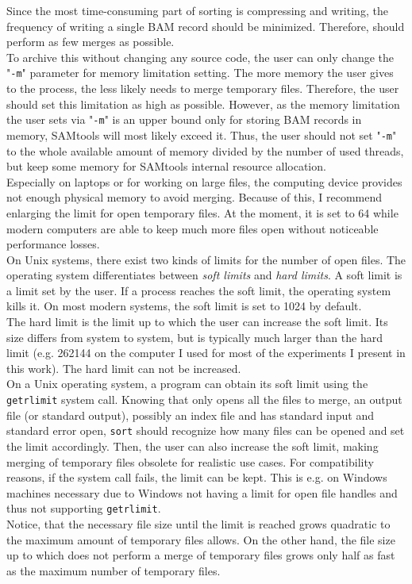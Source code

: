 Since the most time-consuming part of sorting is compressing and writing, the frequency of writing a single BAM record should be minimized. Therefore, \sort should perform as few merges as possible. \\
To archive this without changing any source code, the user can only change the "\texttt{-m}" parameter for memory limitation setting. The more memory the user gives to the process, the less likely \sort needs to merge temporary files. Therefore, the user should set this limitation as high as possible. However, as the memory limitation the user sets via "\texttt{-m}" is an upper bound only for storing BAM records in memory, SAMtools will most likely exceed it. Thus, the user should not set "\texttt{-m}" to the whole available amount of memory divided by the number of used threads, but keep some memory for SAMtools internal resource allocation. \\
Especially on laptops or for working on large files, the computing device provides not enough physical memory to avoid merging. Because of this, I recommend enlarging the limit for open temporary files. At the moment, it is set to 64 while modern computers are able to keep much more files open without noticeable performance losses. \\
On Unix systems, there exist two kinds of limits for the number of open files. The operating system differentiates between \textit{soft limits} and \textit{hard limits}.
A soft limit is a limit set by the user. If a process reaches the soft limit, the operating system kills it. On most modern systems, the soft limit is set to 1024 by default. \\
The hard limit is the limit up to which the user can increase the soft limit. Its size differs from system to system, but is typically much larger than the hard limit (e.g. 262144 on the computer I used for most of the experiments I present in this work). The hard limit can not be increased. \\
On a Unix operating system, a program can obtain its soft limit using the \texttt{getrlimit} \cite{noauthor_getrlimit2_nodate} system call. Knowing that \sort only opens all the files to merge, an output file (or standard output), possibly an index file and has standard input and standard error open, \texttt{sort} should recognize how many files can be opened and set the limit accordingly. Then, the user can also increase the soft limit, making merging of temporary files obsolete for realistic use cases. For compatibility reasons, if the system call fails, the limit can be kept.
This is e.g. on Windows machines necessary due to Windows not having a limit for open file handles and thus not supporting \texttt{getrlimit}. \\
Notice, that the necessary file size until the limit is reached grows quadratic to the maximum amount of temporary files \sort allows. On the other hand, the file size up to which \sort does not perform a merge of temporary files grows only half as fast as the maximum number of temporary files.

